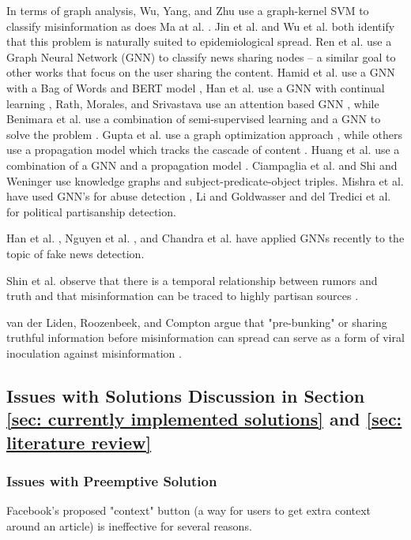 \documentclass[preprint,review,12pt]{elsarticle}
\begin{document}
In terms of graph analysis, Wu, Yang, and Zhu \cite{wu2015false} use a graph-kernel SVM to classify misinformation as does Ma at al. \cite{ma2017detect}. Jin et al. \cite{jin2013epidemiological} and Wu et al. \cite{wu2016mining} both identify that this problem is naturally suited to epidemiological spread. Ren et al. use a Graph Neural Network (GNN) to classify news sharing nodes \cite{ren2020adversarial} -- a similar goal to other works that focus on the user sharing the content. Hamid et al. use a GNN with a Bag of Words and BERT model \cite{hamid2020fake}, Han et al. use a GNN with continual learning \cite{han2020graph}, Rath, Morales, and Srivastava use an attention based GNN \cite{rath2021scarlet}, while Benimara et al. use a combination of semi-supervised learning and a GNN to solve the problem \cite{benamira2019semi}.  Gupta et al. use a graph optimization approach \cite{gupta2012evaluating}, while others use a propagation model which tracks the cascade of content \cite{jin2016news,jin2014news,zhou2018fake,kashima2003marginalized}. Huang et al. use a combination of a GNN and a propagation model \cite{huang2019deep}. Ciampaglia et al. \cite{ciampaglia2015computational} and Shi and Weninger \cite{shi2016discriminative} use knowledge graphs and subject-predicate-object triples. Mishra et al. have used GNN's for abuse detection \cite{mishra2019abusive}, Li and Goldwasser \cite{li2019encoding} and del Tredici et al. \cite{del2019you} for political partisanship detection. 


Han et al. \cite{han2020graph}, Nguyen et al. \cite{nguyen2020fang}, and Chandra et al. \cite{chandra2020graph} have applied GNNs recently to the topic of fake news detection. 

 Shin et al. observe that there is a temporal relationship between rumors and truth and that misinformation can be traced to highly partisan sources \cite{shin2018diffusion}.
 
 
 van der Liden, Roozenbeek, and Compton argue that "pre-bunking" or sharing truthful information before misinformation can spread can serve as a form of viral inoculation against misinformation \cite{van2020inoculating}.
 
 \subsection{Issues with Solutions Discussion in Section \ref{sec: currently implemented solutions} and \ref{sec: literature review}}
 \subsubsection{Issues with Preemptive Solution}
 Facebook's proposed "context" button (a way for users to get extra context around an article) is ineffective for several reasons. 
 
\end{document}

